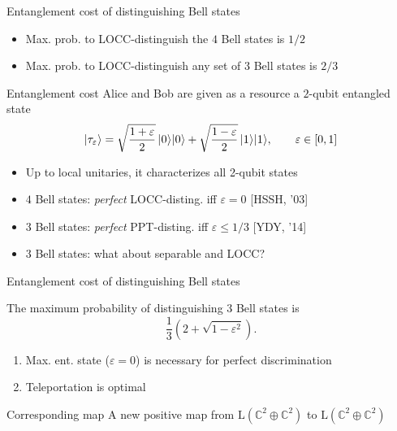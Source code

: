 \documentclass{beamer}
\def\complex{\mathbb{C}}
\newcommand{\setft}[1]{\mathrm{#1}}
\newcommand{\Lin}{\setft{L}}
\newcommand{\microspace}{\mspace{0.5mu}}
\newcommand{\ket}[1]{
  \lvert\microspace #1 \microspace \rangle}
\def\eps{\varepsilon}
\begin{document}
    \begin{frame}{Entanglement cost of distinguishing Bell states}
        \begin{itemize}
          \item Max. prob. to LOCC-distinguish the $4$ Bell states is $1/2$
          \item Max. prob. to LOCC-distinguish any set of $3$ Bell states is $2/3$
        \end{itemize}
        \begin{block}{Entanglement cost}
            Alice and Bob are given as a resource a $2$-qubit entangled state
            \[
                \ket{\tau_{\eps}} = \sqrt{\frac{1 + \eps}{2}}\,\ket{0}\ket{0} + 
                  \sqrt{\frac{1 - \eps}{2}}\,\ket{1}\ket{1}, \qquad \eps\in[0,1]
            \]
        \end{block}
        \begin{itemize}
            \item Up to local unitaries, it characterizes all 2-qubit states
            \item $4$ Bell states: \emph{perfect} LOCC-disting. iff $\eps = 0$ [HSSH, '03] 
            \item $3$ Bell states: \emph{perfect} PPT-disting. iff $\eps \leq 1/3$ [YDY, '14]
            \item $3$ Bell states: what about separable and LOCC?   
        \end{itemize}
    \end{frame}

    \begin{frame}{Entanglement cost of distinguishing Bell states}
        \begin{theorem}[new]
        The maximum probability of distinguishing 3 Bell states is
        \[
            \frac{1}{3}\left(2 + \sqrt{1 - \eps^{2}}\right).
        \]
        \end{theorem}
        \begin{corollary}
            \begin{enumerate}
                \item Max. ent. state ($\eps=0$) is necessary for 
                    perfect discrimination
                \item Teleportation is optimal
            \end{enumerate}
        \end{corollary}
        \begin{block}{Corresponding map}
            A new positive map from $\Lin(\complex^{2}\oplus\complex^{2})$ to $\Lin(\complex^{2}\oplus\complex^{2})$
        \end{block}
    \end{frame}
 
\end{document}
